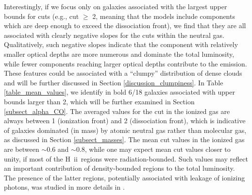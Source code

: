 \documentclass{aa}
\newcommand{\hii}{H~{\sc ii}}
\begin{document}
Interestingly, if we focus only on galaxies associated with the largest upper bounds for cuts (e.g., cut $\geq$ 2, meaning that the models include components which are deep enough to exceed the dissociation front), we find that they are all associated with clearly negative slopes for the cuts within the neutral gas. Qualitatively, such negative slopes indicate that the component with relatively smaller optical depths are more numerous and dominate the total luminosity, while fewer components reaching larger optical depths contribute to the emission. These features could be associated with a “clumpy” distribution of dense clouds and will be further discussed in Section \ref{discussion_clumpiness}. In Table \ref{table_mean_values}, we identify in bold 6/18 galaxies associated with upper bounds larger than 2, which will be further examined in Section \ref{subsect_alpha_CO}. The averaged values for the cut in the ionized gas are always between 1 (ionization front) and 2 (dissociation front), which is indicative of galaxies dominated (in mass) by atomic neutral gas rather than molecular gas, as discussed in Section \ref{subsect_masses}. The mean cut values in the ionized gas are between $\sim 0.6$ and $\sim 0.8$, while one may expect mean cut values closer to unity, if most of the \hii\ regions were radiation-bounded. Such values may reflect an important contribution of density-bounded regions to the total luminosity. The presence of the latter regions, potentially associated with leakage of ionizing photons, was studied in more details in \cite{Ramambason2022}.



\end{document}
